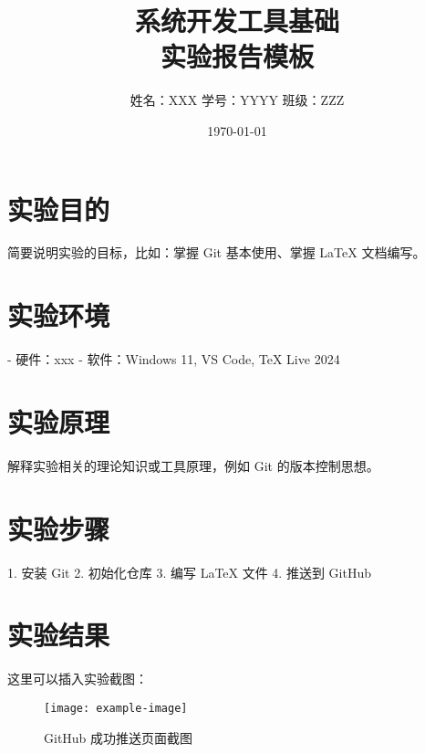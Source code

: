 \documentclass[UTF8]{ctexart}
\title{系统开发工具基础\\实验报告模板}
\author{姓名：XXX \quad 学号：YYYY \quad 班级：ZZZ}
\date{\today}
\begin{document}

\maketitle 

\tableofcontents 
\newpage

\section{实验目的}
简要说明实验的目标，比如：掌握 Git 基本使用、掌握 LaTeX 文档编写。

\section{实验环境}
- 硬件：xxx  
- 软件：Windows 11, VS Code, TeX Live 2024  

\section{实验原理}
解释实验相关的理论知识或工具原理，例如 Git 的版本控制思想。

\section{实验步骤}
1. 安装 Git  
2. 初始化仓库  
3. 编写 LaTeX 文件  
4. 推送到 GitHub  

\section{实验结果}
这里可以插入实验截图：  
\begin{figure}[h]
  \centering
  \texttt{[image: example-image]}
  \caption{GitHub 成功推送页面截图}
\end{figure}
\end{document}
